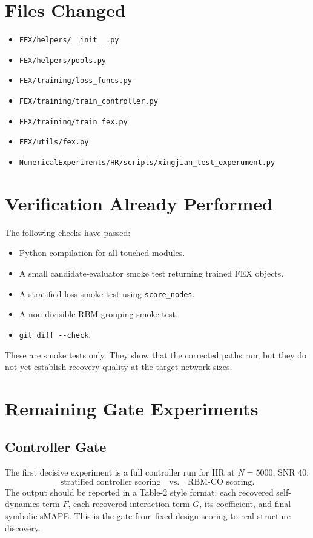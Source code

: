 \documentclass[11pt]{article}
\begin{document}
\section{Files Changed}

\begin{itemize}
    \item \verb|FEX/helpers/__init__.py|
    \item \verb|FEX/helpers/pools.py|
    \item \verb|FEX/training/loss_funcs.py|
    \item \verb|FEX/training/train_controller.py|
    \item \verb|FEX/training/train_fex.py|
    \item \verb|FEX/utils/fex.py|
    \item \verb|NumericalExperiments/HR/scripts/xingjian_test_experument.py|
\end{itemize}

\section{Verification Already Performed}

The following checks have passed:
\begin{itemize}
    \item Python compilation for all touched modules.
    \item A small candidate-evaluator smoke test returning trained FEX objects.
    \item A stratified-loss smoke test using \verb|score_nodes|.
    \item A non-divisible RBM grouping smoke test.
    \item \verb|git diff --check|.
\end{itemize}

These are smoke tests only.  They show that the corrected paths run, but they
do not yet establish recovery quality at the target network sizes.

\section{Remaining Gate Experiments}

\subsection{Controller Gate}

The first decisive experiment is a full controller run for HR at $N=5000$,
SNR 40:
\begin{equation}
    \text{stratified controller scoring}
    \quad\text{vs.}\quad
    \text{RBM-CO scoring}.
\end{equation}
The output should be reported in a Table-2 style format: each recovered
self-dynamics term $F$, each recovered interaction term $G$, its coefficient,
and final symbolic sMAPE.  This is the gate from fixed-design scoring to real
structure discovery.
\end{document}

